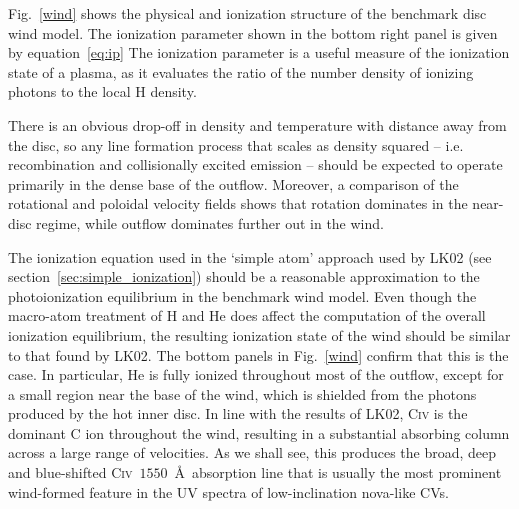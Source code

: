 Fig.~\ref{wind} shows the physical and ionization structure 
of the benchmark disc wind model. The ionization parameter shown in the bottom
right panel is given by equation~\ref{eq:ip}
 The ionization parameter is a useful measure of the ionization state of a plasma, 
as it evaluates the ratio of the number density of ionizing photons to the local 
H density.

There is an obvious drop-off in density
and temperature with distance away from the disc, so any line
formation process that scales as density squared -- i.e. recombination and
collisionally excited emission -- should be expected to operate
primarily in the dense base of the outflow. Moreover, a comparison of
the rotational and poloidal velocity fields shows that rotation
dominates in the near-disc regime, while outflow dominates further out
in the wind. 

The ionization equation used in the `simple atom' approach used by
LK02 (see section~\ref{sec:simple_ionization}) should be a reasonable approximation to
the photoionization equilibrium in the benchmark wind model. Even
though the macro-atom treatment of H and He does affect the 
computation of the overall ionization equilibrium, the
resulting ionization state of the wind should be similar to that
found by LK02. The bottom panels in Fig.~\ref{wind} confirm that this
is the case. In particular, He is fully ionized
throughout most of the outflow, except for a small region near the
base of the wind, which is shielded from the photons produced by the
hot inner disc. In line with the results of LK02,
C\textsc{iv} is the dominant C ion throughout the wind,
resulting in a substantial absorbing column across a large range of
velocities. As we shall see, this produces the broad, deep and
blue-shifted C\textsc{iv}~$1550$~\AA\ absorption line that
is usually the most prominent wind-formed feature in the UV spectra of
low-inclination nova-like CVs.

